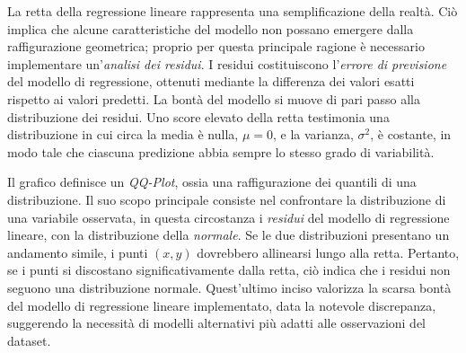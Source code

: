 \documentclass{article}
\begin{document}
    La retta della regressione lineare rappresenta una semplificazione della realtà. Ciò implica che alcune caratteristiche del modello non possano emergere dalla raffigurazione geometrica; proprio per questa principale ragione è necessario implementare un'\textit{analisi dei residui}. I residui costituiscono l'\textit{errore di previsione} del modello di regressione, ottenuti mediante la differenza dei valori esatti rispetto ai valori predetti. La bontà del modello si muove di pari passo alla distribuzione dei residui. Uno score elevato della retta testimonia una distribuzione in cui circa la media è nulla, $\mu=0$, e la varianza, $\sigma^2$, è costante, in modo tale che ciascuna predizione abbia sempre lo stesso grado di variabilità. 
    \begin{center}
    \end{center}
    Il grafico definisce un \textit{QQ-Plot}, ossia una raffigurazione dei quantili di una distribuzione. Il suo scopo principale consiste nel confrontare la distribuzione di una variabile osservata, in questa circostanza i \textit{residui} del modello di regressione lineare, con la distribuzione della \textit{normale}. Se le due distribuzioni presentano un andamento simile, i punti $(x,y)$ dovrebbero allinearsi lungo alla retta. Pertanto, se i punti si discostano significativamente dalla retta, ciò indica che i residui non seguono una distribuzione normale. Quest'ultimo inciso valorizza la scarsa bontà del modello di regressione lineare implementato, data la notevole discrepanza, suggerendo la necessità di modelli alternativi più adatti alle osservazioni del dataset. 

    \newpage
\end{document}
